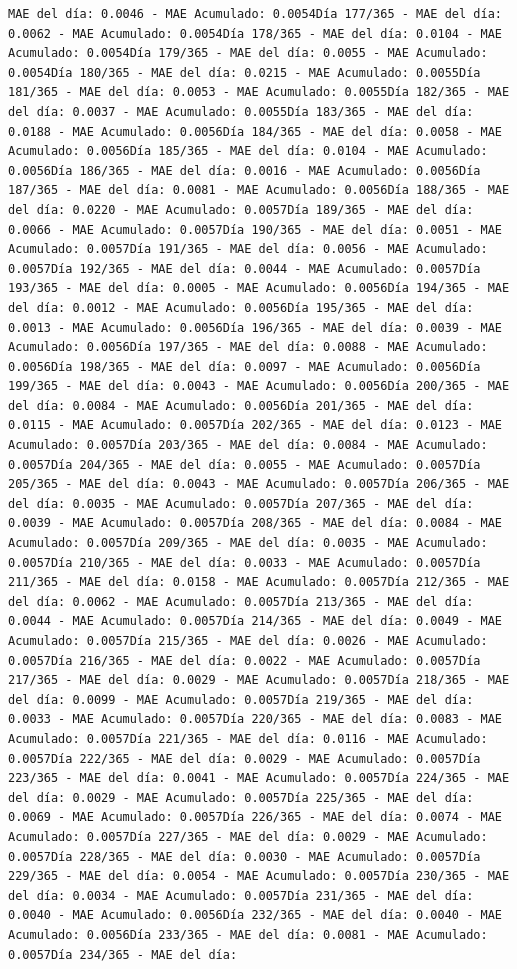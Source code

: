 \documentclass[
]{book}
\begin{document}
\begin{verbatim}
MAE del día: 0.0046 - MAE Acumulado: 0.0054Día 177/365 - MAE del día: 0.0062 - MAE Acumulado: 0.0054Día 178/365 - MAE del día: 0.0104 - MAE Acumulado: 0.0054Día 179/365 - MAE del día: 0.0055 - MAE Acumulado: 0.0054Día 180/365 - MAE del día: 0.0215 - MAE Acumulado: 0.0055Día 181/365 - MAE del día: 0.0053 - MAE Acumulado: 0.0055Día 182/365 - MAE del día: 0.0037 - MAE Acumulado: 0.0055Día 183/365 - MAE del día: 0.0188 - MAE Acumulado: 0.0056Día 184/365 - MAE del día: 0.0058 - MAE Acumulado: 0.0056Día 185/365 - MAE del día: 0.0104 - MAE Acumulado: 0.0056Día 186/365 - MAE del día: 0.0016 - MAE Acumulado: 0.0056Día 187/365 - MAE del día: 0.0081 - MAE Acumulado: 0.0056Día 188/365 - MAE del día: 0.0220 - MAE Acumulado: 0.0057Día 189/365 - MAE del día: 0.0066 - MAE Acumulado: 0.0057Día 190/365 - MAE del día: 0.0051 - MAE Acumulado: 0.0057Día 191/365 - MAE del día: 0.0056 - MAE Acumulado: 0.0057Día 192/365 - MAE del día: 0.0044 - MAE Acumulado: 0.0057Día 193/365 - MAE del día: 0.0005 - MAE Acumulado: 0.0056Día 194/365 - MAE del día: 0.0012 - MAE Acumulado: 0.0056Día 195/365 - MAE del día: 0.0013 - MAE Acumulado: 0.0056Día 196/365 - MAE del día: 0.0039 - MAE Acumulado: 0.0056Día 197/365 - MAE del día: 0.0088 - MAE Acumulado: 0.0056Día 198/365 - MAE del día: 0.0097 - MAE Acumulado: 0.0056Día 199/365 - MAE del día: 0.0043 - MAE Acumulado: 0.0056Día 200/365 - MAE del día: 0.0084 - MAE Acumulado: 0.0056Día 201/365 - MAE del día: 0.0115 - MAE Acumulado: 0.0057Día 202/365 - MAE del día: 0.0123 - MAE Acumulado: 0.0057Día 203/365 - MAE del día: 0.0084 - MAE Acumulado: 0.0057Día 204/365 - MAE del día: 0.0055 - MAE Acumulado: 0.0057Día 205/365 - MAE del día: 0.0043 - MAE Acumulado: 0.0057Día 206/365 - MAE del día: 0.0035 - MAE Acumulado: 0.0057Día 207/365 - MAE del día: 0.0039 - MAE Acumulado: 0.0057Día 208/365 - MAE del día: 0.0084 - MAE Acumulado: 0.0057Día 209/365 - MAE del día: 0.0035 - MAE Acumulado: 0.0057Día 210/365 - MAE del día: 0.0033 - MAE Acumulado: 0.0057Día 211/365 - MAE del día: 0.0158 - MAE Acumulado: 0.0057Día 212/365 - MAE del día: 0.0062 - MAE Acumulado: 0.0057Día 213/365 - MAE del día: 0.0044 - MAE Acumulado: 0.0057Día 214/365 - MAE del día: 0.0049 - MAE Acumulado: 0.0057Día 215/365 - MAE del día: 0.0026 - MAE Acumulado: 0.0057Día 216/365 - MAE del día: 0.0022 - MAE Acumulado: 0.0057Día 217/365 - MAE del día: 0.0029 - MAE Acumulado: 0.0057Día 218/365 - MAE del día: 0.0099 - MAE Acumulado: 0.0057Día 219/365 - MAE del día: 0.0033 - MAE Acumulado: 0.0057Día 220/365 - MAE del día: 0.0083 - MAE Acumulado: 0.0057Día 221/365 - MAE del día: 0.0116 - MAE Acumulado: 0.0057Día 222/365 - MAE del día: 0.0029 - MAE Acumulado: 0.0057Día 223/365 - MAE del día: 0.0041 - MAE Acumulado: 0.0057Día 224/365 - MAE del día: 0.0029 - MAE Acumulado: 0.0057Día 225/365 - MAE del día: 0.0069 - MAE Acumulado: 0.0057Día 226/365 - MAE del día: 0.0074 - MAE Acumulado: 0.0057Día 227/365 - MAE del día: 0.0029 - MAE Acumulado: 0.0057Día 228/365 - MAE del día: 0.0030 - MAE Acumulado: 0.0057Día 229/365 - MAE del día: 0.0054 - MAE Acumulado: 0.0057Día 230/365 - MAE del día: 0.0034 - MAE Acumulado: 0.0057Día 231/365 - MAE del día: 0.0040 - MAE Acumulado: 0.0056Día 232/365 - MAE del día: 0.0040 - MAE Acumulado: 0.0056Día 233/365 - MAE del día: 0.0081 - MAE Acumulado: 0.0057Día 234/365 - MAE del día: 
\end{verbatim}
\end{document}
